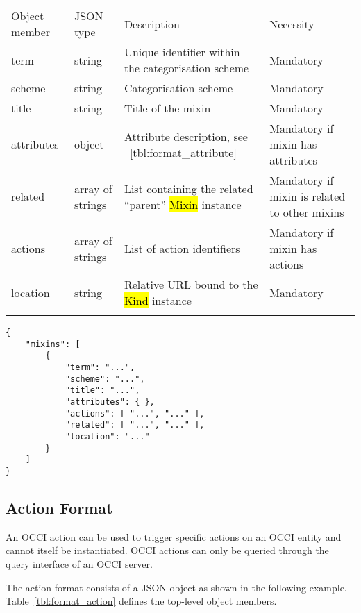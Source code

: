\documentclass[10pt,a4paper]{article}
\begin{document}
 {
    \begin{tabular}{llll}
    \toprule
    Object member & JSON type & Description & Necessity\\
    \colrule
    term & string & Unique identifier within the categorisation scheme & Mandatory\\
    scheme & string & Categorisation scheme & Mandatory\\
    title & string & Title of the mixin & Mandatory\\
    attributes & object & Attribute description, see ~\ref{tbl:format_attribute} & Mandatory if mixin has attributes\\
    related & array of strings & List containing the related ``parent'' \hl{Mixin} instance & Mandatory if mixin is related to other mixins\\
    actions & array of strings & List of action identifiers & Mandatory if mixin has actions\\
    location & string & Relative URL bound to the \hl{Kind} instance & Mandatory\\
    \botrule
    \end{tabular}
}

\begin{verbatim}
{
    "mixins": [
        {
            "term": "...",
            "scheme": "...",
            "title": "...",
            "attributes": { },
            "actions": [ "...", "..." ],
            "related": [ "...", "..." ],
            "location": "..."
        }
    ]
}
\end{verbatim}

\subsection{Action Format}
\label{sec:format_action}

An OCCI action can be used to trigger specific actions on an OCCI entity and cannot itself be 
instantiated. OCCI actions can only be queried through the query interface 
of an OCCI server.

The action format consists of a JSON object as shown in the
following example.
Table~\ref{tbl:format_action} defines the top-level object members.
\end{document}

